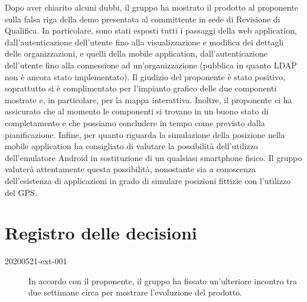 \documentclass{article}
\begin{document}
Dopo aver chiarito alcuni dubbi, il gruppo ha mostrato il prodotto al proponente sulla falsa riga della demo presentata al committente in sede di Revisione di Qualifica.
In particolare, sono stati esposti tutti i passaggi della web application, dall'autenticazione dell'utente fino alla visualizzazione e modifica dei dettagli delle organizzazioni, e quelli della mobile application, dall'autenticazione dell'utente fino alla connessione ad un'organizzazione (pubblica in quanto LDAP non è ancora stato implementato).
Il giudizio del proponente è stato positivo, soprattutto si è complimentato per l'impianto grafico delle due componenti mostrate e, in particolare, per la mappa interattiva.
Inoltre, il proponente ci ha assicurato che al momento le componenti si trovano in un buono stato di completamento e che possiamo concludere in tempo come previsto dalla pianificazione.
Infine, per quanto riguarda la simulazione della posizione nella mobile application ha consigliato di valutare la possibilità dell'utilizzo dell'emulatore Android in sostituzione di un qualsiasi smartphone fisico. Il gruppo valuterà attentamente questa possibilità, nonostante sia a conoscenza dell'esistenza di applicazioni in grado di simulare posizioni fittizie con l'utilizzo del GPS\@.

\newpage
\section{Registro delle decisioni}%
\label{sec:registro_delle_decisioni}

\begin{description}
  \item[20200521-ext-001] In accordo con il proponente, il gruppo ha fissato un'ulteriore incontro tra due settimane circa per mostrare l'evoluzione del prodotto.
\end{description}
\end{document}
